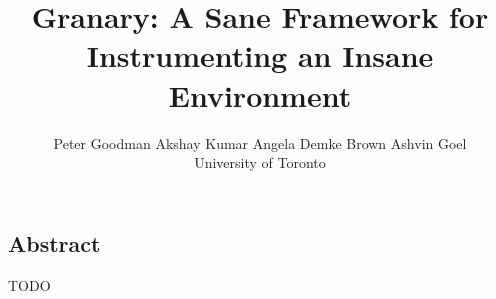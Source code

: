 \documentclass[letterpaper,twocolumn,10pt]{article}
\begin{document}
\date{}

\title{\Large \bf Granary: A Sane Framework for Instrumenting an Insane Environment}

\author{
{\rm Peter Goodman} \hspace{1.5em} {\rm Akshay Kumar} \hspace{1.5em} {\rm Angela Demke Brown} \hspace{1.5em} {\rm Ashvin Goel}\\
University of Toronto
} %


\twocolumn[\maketitle]
\subsection*{Abstract}
TODO

%
\end{document}
